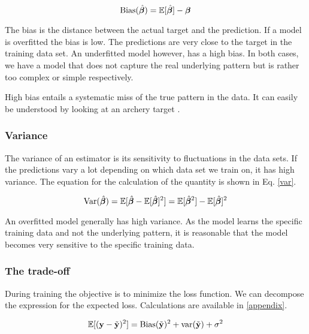 \begin{equation}\label{bias}
    \text{Bias}(\hat{\boldsymbol{\beta}}) = \mathbb{E}[\hat{\boldsymbol{\beta}}]-\boldsymbol{\beta}
\end{equation}

The bias is the distance between the actual target and the prediction. If a model is overfitted the bias is low. The predictions are very close to the target in the training data set. An underfitted model however, has a high bias. In both cases, we have a model that does not capture the real underlying pattern but is rather too complex or simple respectively. 

High bias entails a systematic miss of the true pattern in the data. It can easily be understood by looking at an archery target . 

\subsubsection{Variance}

The variance of an estimator is its sensitivity to fluctuations in the data sets. If the predictions vary a lot depending on which data set we train on, it has high variance. The equation for the calculation of the quantity is shown in Eq. \ref{var}. 

\begin{equation}\label{var}
    \text{Var}(\hat{\boldsymbol{\beta}}) = \mathbb{E}[\hat{\boldsymbol{\beta}}-\mathbb{E}[\hat{\boldsymbol{\beta}}]^2] = \mathbb{E}[\hat{\boldsymbol{\beta}}^2] - \mathbb{E}[\hat{\boldsymbol{\beta}}]^2
\end{equation}

An overfitted model generally has high variance.  As the model learns the specific training data and not the underlying pattern, it is reasonable that the model becomes very sensitive to the specific training data. 

\subsubsection{The trade-off}


During training the objective is to minimize the loss function.  We can decompose the expression for the expected loss. Calculations are available in \ref{appendix}. 

\begin{equation}\label{biasvar}
    \mathbb{E}[(\mathbf{y} - \Tilde{\mathbf{y}})^2] = \text{Bias}(\Tilde{\mathbf{y}})^2 + \text{var}(\Tilde{\mathbf{y}}) + \sigma^2
\end{equation}

